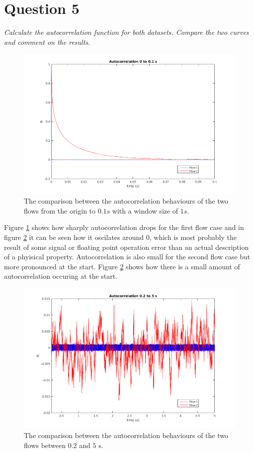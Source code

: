 \section*{Question 5}
\textit{Calculate the autocorrelation function for both datasets. Compare the two curves and comment on the results.}

\begin{figure}[!ht]
\centering
\includegraphics[scale=0.5]{./TEXT/auto1.png}
\caption{The comparison between the autocorrelation behaviours of the two flows from the origin to $0.1s$ with a window size of $1s$.}
\label{auto1}
\end{figure}
Figure \ref{auto1} shows how sharply autocorrelation drops for the first flow case and in figure \ref{auto2} it can be seen how it oscilates around $0$, which is most probably the result of some signal or floating point operation error than an actual description of a phyisical property. Autocorrelation is also small for the second flow case but more pronounced at the start. Figure \ref{auto2} shows how there is a small amount of autocorrelation occuring at the start.
\begin{figure}[!ht]
\centering
\includegraphics[scale=0.5]{./TEXT/auto2.png}
\caption{The comparison between the autocorrelation behaviours of the two flows between $0.2$ and $5$ s.}
\label{auto2}
\end{figure}